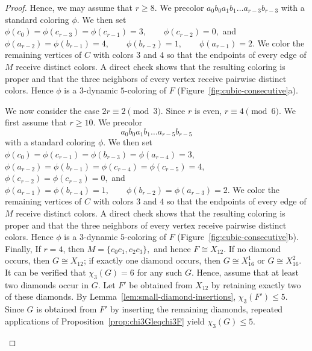 \documentclass[a4paper,11pt]{article}
\providecommand{\tikzsetnextfilename}[1]{}
\theoremstyle{case}
\numberwithin{subcase}{case}
\begin{document}
\begin{proof}
Hence, we may assume that $r\geq8$. We precolor
$
a_0b_0a_1b_1\ldots a_{r-3}b_{r-3}
$
with a standard coloring $\phi$. We then set
$
\phi(c_0)=\phi(c_{r-3})=\phi(c_{r-1})=3,
\qquad
\phi(c_{r-2})=0,
$
and
$
\phi(a_{r-2})=\phi(b_{r-1})=4,\qquad
\phi(b_{r-2})=1,\qquad
\phi(a_{r-1})=2.
$
We color the remaining vertices of $C$ with colors $3$ and $4$ so that
the endpoints of every edge of $M$ receive distinct colors.
A direct check shows that the resulting coloring is proper and that the
three neighbors of every vertex receive pairwise distinct colors.
Hence $\phi$ is a $3$-dynamic $5$-coloring of $F$
(Figure~\ref{fig:cubic-consecutive}a).

We now consider the case $2r\equiv2\pmod3$. Since $r$ is even,
$r\equiv4\pmod6$. We first assume that $r\geq10$.
We precolor
\[
a_0b_0a_1b_1\ldots a_{r-5}b_{r-5}
\]
with a standard coloring $\phi$. We then set
$
\phi(c_0)=\phi(c_{r-1})=\phi(b_{r-3})
=\phi(a_{r-4})=3,
$
$
\phi(a_{r-2})=\phi(b_{r-1})
=\phi(c_{r-4})=\phi(c_{r-5})=4,
$
$
\phi(c_{r-2})=\phi(c_{r-3})=0,
$ and
$
\phi(a_{r-1})=\phi(b_{r-4})=1,
\qquad
\phi(b_{r-2})=\phi(a_{r-3})=2.
$
We color the remaining vertices of $C$ with colors $3$ and $4$ so that
the endpoints of every edge of $M$ receive distinct colors.
A direct check shows that the resulting coloring is proper and that the
three neighbors of every vertex receive pairwise distinct colors.
Hence $\phi$ is a $3$-dynamic $5$-coloring of $F$
(Figure~\ref{fig:cubic-consecutive}b).
Finally, If $r=4$, then
$
M=\{c_0c_1,c_2c_3\},
$
and hence $F\cong X_{12}$. If no diamond occurs, then
$G\cong X_{12}$; if exactly one diamond occurs, then
$G\cong X_{16}^1$ or $G\cong X_{16}^2$. It can be verified that $\chi_3(G)=6$ for any such $G$. Hence, assume that at least two diamonds occur in $G$.
Let $F'$ be obtained from $X_{12}$ by retaining exactly two of these
diamonds. By Lemma~\ref{lem:small-diamond-insertions},
$\chi_3(F')\leq5$. Since $G$ is obtained from $F'$ by inserting the
remaining diamonds, repeated applications of
Proposition~\ref{prop:chi3Gleqchi3F} yield $\chi_3(G)\leq5$.


\begin{figure}[H]
    \centering

    \begin{subfigure}{0.48\textwidth}
        \centering


\tikzsetnextfilename{fig-cubic-consecutive-1}
\begin{tikzpicture}[scale=1,
    vertex/.style={circle, fill=black, inner sep=2pt}
]


\end{tikzpicture}
\end{subfigure}
\end{figure}
\end{proof}
\end{document}
